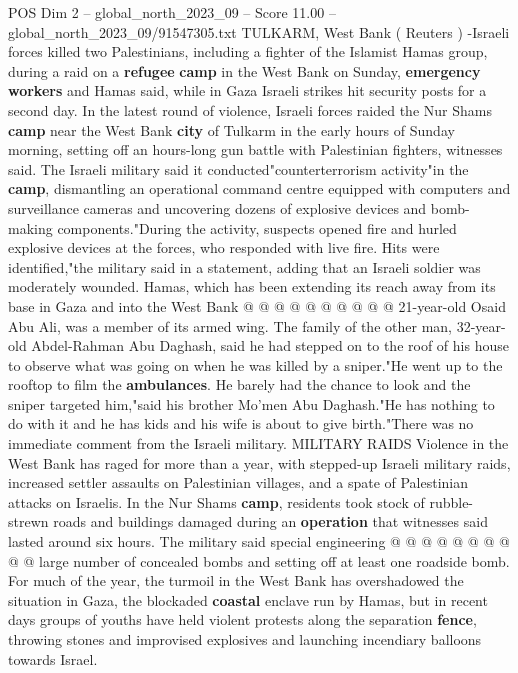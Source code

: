 \begin{textsample}{POS Dim 2 – global\_north\_2023\_09 – Score 11.00 – global\_north\_2023\_09/91547305.txt}  \label{ex:f2_pos_374}
TULKARM, West Bank ( Reuters ) -Israeli forces killed two Palestinians, including a fighter of the Islamist Hamas group, during a raid on a \textbf{refugee} \textbf{camp} in the West Bank on Sunday, \textbf{emergency} \textbf{workers} and Hamas said, while in Gaza Israeli strikes hit security posts for a second day.
In the latest round of violence, Israeli forces raided the Nur Shams \textbf{camp} near the West Bank \textbf{city} of Tulkarm in the early hours of Sunday morning, setting off an hours-long gun battle with Palestinian fighters, witnesses said.
The Israeli military said it conducted"counterterrorism activity"in the \textbf{camp}, dismantling an operational command centre equipped with computers and surveillance cameras and uncovering dozens of explosive devices and bomb-making components."During the activity, suspects opened fire and hurled explosive devices at the forces, who responded with live fire.
Hits were identified,"the military said in a statement, adding that an Israeli soldier was moderately wounded.
Hamas, which has been extending its reach away from its base in Gaza and into the West Bank @ @ @ @ @ @ @ @ @ @ 21-year-old Osaid Abu Ali, was a member of its armed wing.
The family of the other man, 32-year-old Abdel-Rahman Abu Daghash, said he had stepped on to the roof of his house to observe what was going on when he was killed by a sniper."He went up to the rooftop to film the \textbf{ambulances}.
He barely had the chance to look and the sniper targeted him,"said his brother Mo'men Abu Daghash."He has nothing to do with it and he has kids and his wife is about to give birth."There was no immediate comment from the Israeli military.
MILITARY RAIDS Violence in the West Bank has raged for more than a year, with stepped-up Israeli military raids, increased settler assaults on Palestinian villages, and a spate of Palestinian attacks on Israelis.
In the Nur Shams \textbf{camp}, residents took stock of rubble-strewn roads and buildings damaged during an \textbf{operation} that witnesses said lasted around six hours.
The military said special engineering @ @ @ @ @ @ @ @ @ @ large number of concealed bombs and setting off at least one roadside bomb.
For much of the year, the turmoil in the West Bank has overshadowed the situation in Gaza, the blockaded \textbf{coastal} enclave run by Hamas, but in recent days groups of youths have held violent protests along the separation \textbf{fence}, throwing stones and improvised explosives and launching incendiary balloons towards Israel.

\end{textsample}
